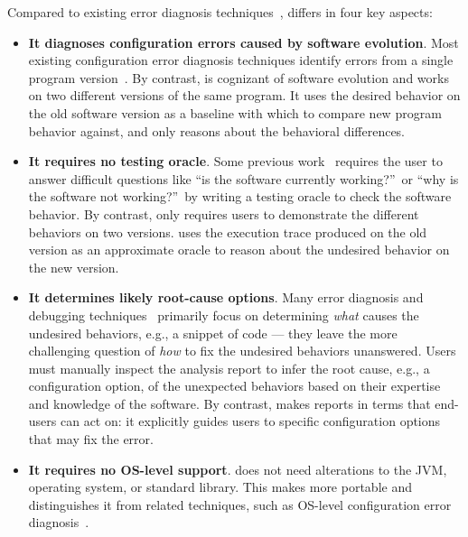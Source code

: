 Compared to existing error diagnosis
techniques~\cite{Wang:2004:AMT, Rabkin:2011:PPC, Whitaker:2004:CDS,
Zhang:2013:ADS, Attariyan:2010:ACT, Su:2007:AIC, Attariyan:2008:UCD, xray
}, \ourtool differs in four
key aspects:

\vspace{-1mm}

\begin{itemize}
\vspace{-1mm}
\item \textbf{It diagnoses configuration errors caused by software evolution}.
Most existing configuration error diagnosis techniques
identify errors from a single program
version~\cite{Wang:2004:AMT, Rabkin:2011:PPC, Whitaker:2004:CDS,
Zhang:2013:ADS, Attariyan:2010:ACT, Su:2007:AIC, Attariyan:2008:UCD, xray}.
By contrast, \ourtool is cognizant of software evolution and
works on two different versions of the same program. 
It uses the desired behavior on the old software version
as a baseline with which to compare new program behavior against, and only
reasons about the behavioral differences.

\item \textbf{It requires no testing oracle}.
Some previous work~\cite{Rabkin:2011:PPC, Whitaker:2004:CDS,
Attariyan:2010:ACT, Su:2007:AIC} requires the user to answer difficult
questions like ``is the software currently working?''\ or ``why is the
software not working?''\ by writing a testing
oracle to check the software behavior. By contrast,
\ourtool only requires users to
demonstrate the different behaviors on two versions.
\ourtool uses the execution trace produced on the old
version as an approximate oracle to
reason about the undesired behavior on the new version.

\item \textbf{It determines likely root-cause options}.
Many error diagnosis and debugging techniques~\cite{dd, autoflow}
primarily focus on
determining \textit{what} causes the undesired behaviors, e.g.,
a snippet of code --- they leave the more challenging
question of \textit{how} to fix the undesired behaviors
unanswered.  Users must manually inspect the analysis
report to infer
the root cause, e.g., a configuration option,
of the unexpected behaviors 
based on their expertise and knowledge of the software.
By contrast, \ourtool makes reports in terms that 
end-users can act on:  it explicitly guides users to specific
configuration options that may fix the error.

\item \textbf{It requires no OS-level support}. \ourtool
does not need alterations to the JVM, operating system, or
standard library. This makes \ourtool more portable and
distinguishes it from related techniques, such as
OS-level configuration error diagnosis~\cite{Whitaker:2004:CDS, Su:2007:AIC}.

\end{itemize}

